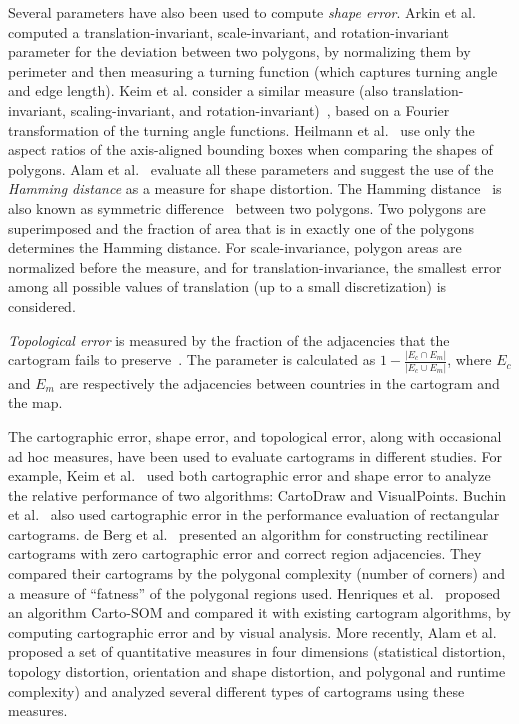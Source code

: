 \documentclass{egpubl}
\begin{document}
Several parameters have also been used to compute \textit{shape error}. Arkin et al.~\cite{ACH91} computed a translation-invariant, scale-invariant, and rotation-invariant parameter for the deviation between two polygons, by normalizing them
 by perimeter and then measuring a turning function (which captures turning angle and edge length). 
Keim et al. consider a similar measure (also translation-invariant, scaling-invariant, and
 rotation-invariant)~\cite{KNPS03}, based on a Fourier transformation of the turning angle functions.
Heilmann et al.~\cite{hkps04} use only the aspect ratios of the axis-aligned bounding boxes
 when comparing the shapes of polygons. Alam et al.~\cite{AKV15} evaluate all these parameters and suggest the use of the \textit{Hamming distance} as a measure for shape distortion. The Hamming distance~\cite{SKI98} is also known as symmetric difference~\cite{MRS10} between two polygons. Two polygons are superimposed and the fraction of area that is in exactly one of the polygons determines the Hamming distance.
 For scale-invariance, polygon areas are normalized before the measure, and for translation-invariance, the smallest error among all possible values of translation (up to a small discretization) is considered.
 
\textit{Topological error} is measured by the fraction of the adjacencies that the cartogram fails to preserve~\cite{hkps04}. The parameter is calculated as $1 - \frac{|E_c\cap E_m|}{|E_c\cup E_m|}$, where $E_c$ and $E_m$ are respectively the adjacencies between countries in the cartogram and the map.

The cartographic error, shape error, and topological error, along with occasional ad hoc measures, have been used to evaluate cartograms in different studies.
 For example, Keim et al.~\cite{KNPS03} used both cartographic error and shape error to analyze the relative performance of two algorithms: CartoDraw and VisualPoints. Buchin et al.~\cite{BSV12} also used cartographic error in the performance evaluation of rectangular cartograms.  de Berg et al.~\cite{BMS10} presented an algorithm for constructing rectilinear cartograms with zero cartographic error and correct region adjacencies. They compared their cartograms by the polygonal complexity (number of corners) and a measure of ``fatness'' of the polygonal regions used. Henriques et al.~\cite{Carto_SOM} proposed an algorithm Carto-SOM and compared it with  existing cartogram algorithms, by computing cartographic error and by visual analysis. More recently, Alam et al.~\cite{AKV15} proposed a set of quantitative measures in four dimensions (statistical distortion, topology distortion, orientation and shape distortion, and polygonal and runtime complexity) and analyzed several different types of cartograms using these measures.
\end{document}
